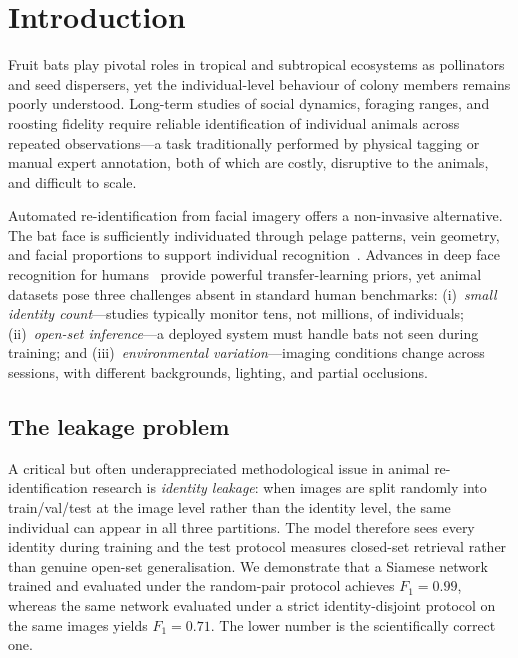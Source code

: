 \section{Introduction}
\label{sec:intro}

Fruit bats play pivotal roles in tropical and subtropical ecosystems as pollinators and
seed dispersers, yet the individual-level behaviour of colony members remains poorly
understood.  Long-term studies of social dynamics, foraging ranges, and roosting fidelity
require reliable identification of individual animals across repeated observations---a
task traditionally performed by physical tagging or manual expert annotation, both of
which are costly, disruptive to the animals, and difficult to scale.

Automated re-identification from facial imagery offers a non-invasive alternative.
The bat face is sufficiently individuated through pelage patterns, vein geometry, and
facial proportions to support individual recognition~\cite{ravela2004visual}.
Advances in deep face recognition for humans~\cite{parkhi2015deep, schroff2015facenet,
deng2019arcface, kim2022adaface} provide powerful transfer-learning priors, yet animal
datasets pose three challenges absent in standard human benchmarks:
(i)~\emph{small identity count}---studies typically monitor tens, not millions, of individuals;
(ii)~\emph{open-set inference}---a deployed system must handle bats not seen during training;
and (iii)~\emph{environmental variation}---imaging conditions change across sessions,
with different backgrounds, lighting, and partial occlusions.

\subsection*{The leakage problem}

A critical but often underappreciated methodological issue in animal re-identification
research is \emph{identity leakage}: when images are split randomly into train/val/test
at the image level rather than the identity level, the same individual can appear in all
three partitions.  The model therefore sees every identity during training and the test
protocol measures closed-set retrieval rather than genuine open-set generalisation.
We demonstrate that a Siamese network trained and evaluated under the random-pair protocol
achieves $F_1 = 0.99$, whereas the same network evaluated under a strict identity-disjoint
protocol on the same images yields $F_1 = 0.71$.  The lower number is the scientifically
correct one.

